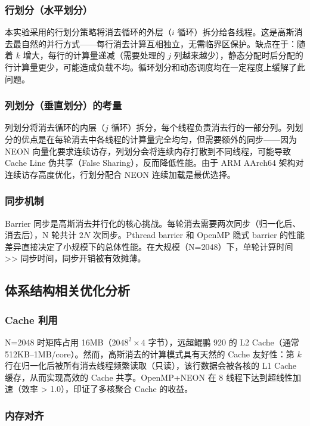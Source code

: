 \documentclass[a4paper]{article}
\begin{document}
\subsubsection{行划分（水平划分）}

本实验采用的行划分策略将消去循环的外层（$i$ 循环）拆分给各线程。这是高斯消去最自然的并行方式——每行消去计算互相独立，无需临界区保护。缺点在于：随着 $k$ 增大，每行的计算量递减（需要处理的 $j$ 列越来越少），静态分配时后分配的行计算量更少，可能造成负载不均。循环划分和动态调度均在一定程度上缓解了此问题。

\subsubsection{列划分（垂直划分）的考量}

列划分将消去循环的内层（$j$ 循环）拆分，每个线程负责消去行的一部分列。列划分的优点是在每轮消去中各线程的计算量完全均匀，但需要额外的同步——因为 NEON 向量化要求连续访存，列划分会将连续内存打散到不同线程，可能导致 Cache Line 伪共享（False Sharing），反而降低性能。由于 ARM AArch64 架构对连续访存高度优化，行划分配合 NEON 连续加载是最优选择。

\subsubsection{同步机制}

Barrier 同步是高斯消去并行化的核心挑战。每轮消去需要两次同步（归一化后、消去后），N 轮共计 $2N$ 次同步。Pthread barrier 和 OpenMP 隐式 barrier 的性能差异直接决定了小规模下的总体性能。在大规模（N=2048）下，单轮计算时间 >> 同步时间，同步开销被有效摊薄。

\subsection{体系结构相关优化分析}

\subsubsection{Cache 利用}

N=2048 时矩阵占用 16MB（$2048^2 \times 4$ 字节），远超鲲鹏 920 的 L2 Cache（通常 512KB--1MB/core）。然而，高斯消去的计算模式具有天然的 Cache 友好性：第 $k$ 行在归一化后被所有消去线程频繁读取（只读），该行数据会被各核的 L1 Cache 缓存，从而实现高效的 Cache 共享。OpenMP+NEON 在 8 线程下达到超线性加速（效率 > 1.0），印证了多核聚合 Cache 的收益。

\subsubsection{内存对齐}
\end{document}
